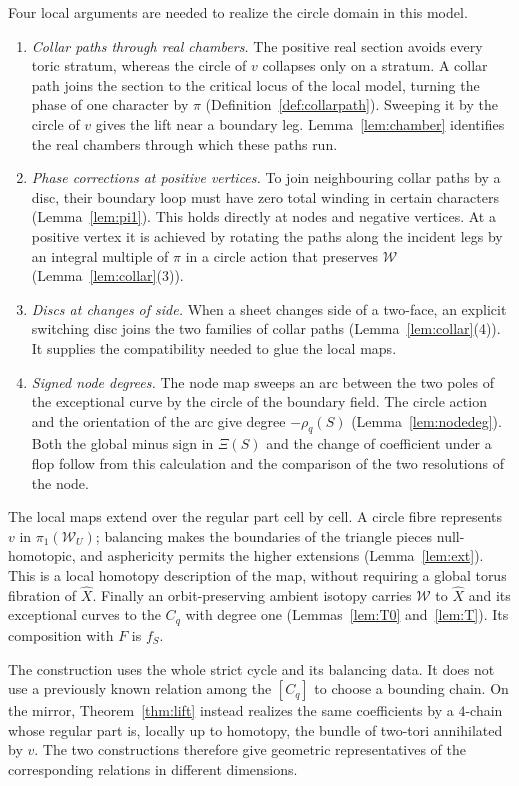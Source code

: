 Four local arguments are needed to realize the circle domain in this model.
\begin{enumerate}
\item \emph{Collar paths through real chambers.} The positive real section avoids every toric stratum, whereas the
circle of $v$ collapses only on a stratum. A collar path joins the section to the critical locus of the local model,
turning the phase of one character by $\pi$ (Definition~\ref{def:collarpath}). Sweeping it by the circle of $v$ gives
the lift near a boundary leg. Lemma~\ref{lem:chamber} identifies the real chambers through which these paths run.
\item \emph{Phase corrections at positive vertices.} To join neighbouring collar paths by a disc, their boundary loop
must have zero total winding in certain characters (Lemma~\ref{lem:pi1}). This holds directly at nodes and negative
vertices. At a positive vertex it is achieved by rotating the paths along the incident legs by an integral multiple of $\pi$ in
a circle action that preserves $\mathscr W$ (Lemma~\ref{lem:collar}(3)).
\item \emph{Discs at changes of side.} When a sheet changes side of a two-face, an explicit switching disc joins the
two families of collar paths (Lemma~\ref{lem:collar}(4)). It supplies the compatibility needed to glue the local maps.
\item \emph{Signed node degrees.} The node map sweeps an arc between the two poles of the exceptional curve by the
circle of the boundary field. The circle action and the orientation of the arc give degree $-\rho_q(S)$
(Lemma~\ref{lem:nodedeg}). Both the global minus sign in $\Xi(S)$ and the change of coefficient under a flop follow
from this calculation and the comparison of the two resolutions of the node.
\end{enumerate}

The local maps extend over the regular part cell by cell. A circle fibre represents $v$ in
$\pi_1(\mathscr W_U)$; balancing makes the boundaries of the triangle pieces null-homotopic, and asphericity permits
the higher extensions (Lemma~\ref{lem:ext}). This is a local homotopy description of the map, without requiring a
global torus fibration of $\widehat X$. Finally an orbit-preserving ambient isotopy carries $\mathscr W$ to $\widehat X$
and its exceptional curves to the $C_q$ with degree one (Lemmas~\ref{lem:T0} and~\ref{lem:T}). Its composition with
$F$ is $f_S$.

The construction uses the whole strict cycle and its balancing data. It does not use a previously known relation
among the $[C_q]$ to choose a bounding chain. On the mirror, Theorem~\ref{thm:lift} instead realizes the same coefficients
by a $4$-chain whose regular part is, locally up to homotopy, the bundle of two-tori annihilated by $v$. The two constructions therefore give geometric
representatives of the corresponding relations in different dimensions.

